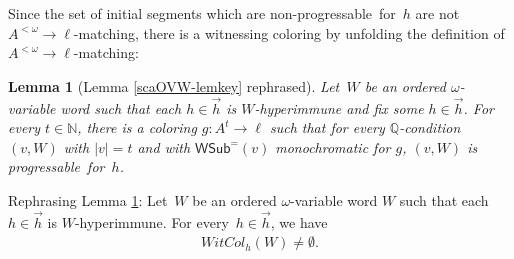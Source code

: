 \documentclass{article}
\def\msf{\mathsf}
\def\uhr{\upharpoonright}
\def\wsamelong{\mathsf{WSub}^{=}}
\def\hjsufficient{$A^{<\omega}\rightarrow\ell$-matching}%
\def\nonprogressable{non-progressable}
\def\progressable{progressable}
\def\wc{WitCol}
\def\opress{opress}
\def\wHJ{$\exists^\infty$-$\msf{IHJ}$}
\def\QQ{\mathbb{Q}}
\newcommand{\NN}[0]{\mathbb{N}}
\numberwithin{theorem}{section}
\newtheorem{lemma}[theorem]{Lemma}
\theoremstyle{definition}
\newtheorem{remark}[theorem]{Remark}
\newtheorem{definition}[theorem]{Definition}
\begin{document}
Since the set of initial segments which are \nonprogressable\ for~$h$ 
are not \hjsufficient,
there is a witnessing coloring  by unfolding the definition of \hjsufficient:
\begin{lemma}[Lemma \ref{scaOVW-lemkey} rephrased]
\label{scaOVW-lemkey2}
Let~$W$ be an ordered $\omega$-variable word
such that each $h \in \vec{h}$ is $W$-hyperimmune and fix some $h \in \vec{h}$.
For every $t\in\NN$, there is a coloring
$g:A^t\rightarrow \ell$ such that
for every $\QQ$-condition\
$(v,W)$  with $|v|=t$
and with $\wsamelong(v)$ monochromatic for
 $g$, $(v,W)$ is \progressable\ for~$h$.

\end{lemma}



Rephrasing Lemma \ref{scaOVW-lemkey2}:
Let~$W$ be an ordered $\omega$-variable word
$W$ such that each $h \in \vec{h}$ is $W$-hyperimmune. For every~$h \in \vec{h}$, we have
\begin{align}\label{scaOVW-eqclaim1}
 \wc_h(W)\ne\emptyset.
\end{align}
\end{document}
